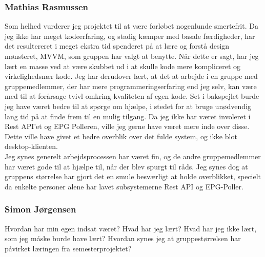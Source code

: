 \subsubsection{Mathias Rasmussen}
Som helhed vurderer jeg projektet til at være forløbet nogenlunde smertefrit. Da jeg ikke har meget kodeerfaring, og stadig kæmper med basale færdigheder, har det resultereret i meget ekstra tid spenderet på at lære og forstå design mønsteret, MVVM, som gruppen har valgt at benytte. Når dette er sagt, har jeg lært en masse ved at være skubbet ud i at skulle kode mere kompliceret og virkelighedsnær kode. Jeg har derudover lært, at det at arbejde i en gruppe med gruppemedlemmer, der har mere programmeringserfaring end jeg selv, kan være med til at forårsage tvivl omkring kvaliteten af egen kode. Set i bakspejlet burde jeg have været bedre til at spørge om hjælpe, i stedet for at bruge unødvendig lang tid på at finde frem til en mulig tilgang. 
Da jeg ikke har været involeret i Rest API'et og EPG Polleren, ville jeg gerne have været mere inde over disse. Dette ville have givet et bedre overblik over det fulde system, og ikke blot desktop-klienten.\\
Jeg synes generelt arbejdsprocessen har været fin, og de andre gruppemedlemmer har været gode til at hjælpe til, når der blev spurgt til råds. Jeg synes dog at gruppens størrelse har gjort det en smule besværligt at holde overblikket, specielt da enkelte personer alene har lavet subsystemerne Rest API og EPG-Poller. 


\subsubsection{Simon Jørgensen}
Hvordan har min egen indsat været?
Hvad har jeg lært?
Hvad har jeg ikke lært, som jeg måske burde have lært?
Hvordan synes jeg at gruppestørrelsen har påvirket læringen fra semesterprojektet?
